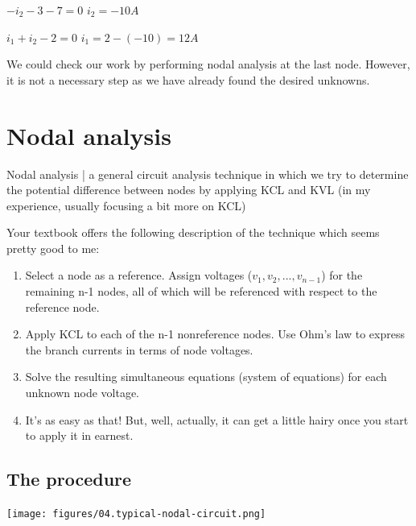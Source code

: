 \documentclass[11pt]{book}
\begin{document}
\subitem $-i_2 - 3 - 7 = 0$
\subitem $i_2 = -10 A$

\subitem $i_1 + i_2 - 2 = 0$
\subitem $i_1 = 2 - (-10) = 12 A$

We could check our work by performing nodal analysis at the last node. However, it is not a necessary step as we have already found the desired unknowns.



\newpage
\section{Nodal analysis}
Nodal analysis | a general circuit analysis technique in which we try to determine the potential difference between nodes by applying KCL and KVL (in my experience, usually focusing a bit more on KCL)

Your textbook offers the following description of the technique which seems pretty good to me:
\begin{enumerate}
	\item Select a node as a reference. Assign voltages ($v_1, v_2, ..., v_{n-1}$) for the remaining n-1 nodes, all of which will be referenced with respect to the reference node.
	\item Apply KCL to each of the n-1 nonreference nodes. Use Ohm’s law to express the branch currents in terms of node voltages.
	\item Solve the resulting simultaneous equations (system of equations) for each unknown node voltage.
	\item It's as easy as that! But, well, actually, it can get a little hairy once you start to apply it in earnest.
\end{enumerate}


\subsection{The procedure}

\begin{center}
	\texttt{[image: figures/04.typical-nodal-circuit.png]}
\end{center}
\end{document}
